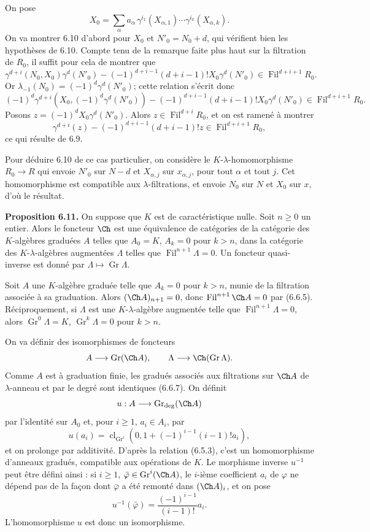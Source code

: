 \documentclass[11pt]{article}
\newcommand{\Gr}{\operatorname{Gr}}
\newcommand{\Fil}{\operatorname{Fil}}
\newcommand{\cl}{\operatorname{cl}}
\providecommand{\Gr}{\operatorname{Gr}}
\providecommand{\Gr}{\operatorname{G}}
\begin{document}
On pose
\[
  X_0=\sum_\alpha a_\alpha\,
       \gamma^{i_1}(X_{\alpha,1})\cdots
       \gamma^{i_k}(X_{\alpha,k}).
\]
On va montrer 6.10 d'abord pour \(X_0\) et \(N'_0=N_0+d\), qui vérifient bien les hypothèses de 6.10. Compte tenu de la remarque faite plus haut sur la filtration de \(R_0\), il suffit pour cela de montrer que
\[
  \gamma^{d+i}(N_0,X_0)\gamma^d(N'_0)
  -
  (-1)^{d+i-1}(d+i-1)!X_0\gamma^d(N'_0)
  \in\Fil^{d+i+1}R_0 .
\]
Or \(\lambda_{-1}(N_0)=(-1)^d\gamma^d(N'_0)\); cette relation s'écrit donc
\[
  (-1)^d\gamma^{d+i}(X_0,(-1)^d\gamma^d(N'_0))
  -
  (-1)^{d+i-1}(d+i-1)!X_0\gamma^d(N'_0)
  \in\Fil^{d+i+1}R_0 .
\]
Posons \(z=(-1)^dX_0\gamma^d(N'_0)\). Alors \(z\in\Fil^{d+i}R_0\), et on est ramené à montrer
\[
  \gamma^{d+i}(z)-(-1)^{d+i-1}(d+i-1)!z\in\Fil^{d+i+1}R_0,
\]
ce qui résulte de 6.9.

Pour déduire 6.10 de ce cas particulier, on considère le \(K\)-\(\lambda\)-homomorphisme \(R_0\to R\) qui envoie \(N'_0\) sur \(N-d\) et \(X_{\alpha,j}\) sur \(x_{\alpha,j}\), pour tout \(\alpha\) et tout \(j\). Cet homomorphisme est compatible aux \(\lambda\)-filtrations, et envoie \(N_0\) sur \(N\) et \(X_0\) sur \(x\), d'où le résultat.

\textbf{Proposition 6.11.} On suppose que \(K\) est de caractéristique nulle. Soit \(n\ge0\) un entier. Alors le foncteur \(\Ch\) est une équivalence de catégories de la catégorie des \(K\)-algèbres graduées \(A\) telles que \(A_0=K\), \(A_k=0\) pour \(k>n\), dans la catégorie des \(K\)-\(\lambda\)-algèbres augmentées \(\Lambda\) telles que \(\Fil^{n+1}\Lambda=0\). Un foncteur quasi-inverse est donné par \(\Lambda\mapsto\Gr\Lambda\).

Soit \(A\) une \(K\)-algèbre graduée telle que \(A_k=0\) pour \(k>n\), munie de la filtration associée à sa graduation. Alors \((\Ch A)_{n+1}=0\), donc \(\Fil^{n+1}\Ch A=0\) par (6.6.5). Réciproquement, si \(\Lambda\) est une \(K\)-\(\lambda\)-algèbre augmentée telle que \(\Fil^{n+1}\Lambda=0\), alors \(\Gr^0\Lambda=K\), \(\Gr^k\Lambda=0\) pour \(k>n\).

On va définir des isomorphismes de foncteurs
\[
  A\longrightarrow \Gr(\Ch A),
  \qquad
  \Lambda\longrightarrow \Ch(\Gr\Lambda).
\]
Comme \(A\) est à graduation finie, les gradués associés aux filtrations sur \(\Ch A\) de \(\lambda\)-anneau et par le degré sont identiques (6.6.7). On définit
\[
  u:A\longrightarrow \Gr_{\deg}(\Ch A)
\]
par l'identité sur \(A_0\) et, pour \(i\ge1\), \(a_i\in A_i\), par
\[
  u(a_i)=\cl_{\Gr^i}\left(0,1+(-1)^{i-1}(i-1)!a_i\right),
\]
et on prolonge par additivité. D'après la relation (6.5.3), c'est un homomorphisme d'anneaux gradués, compatible aux opérations de \(K\). Le morphisme inverse \(u^{-1}\) peut être défini ainsi : si \(i\ge1\), \(\bar\varphi\in\Gr^i(\Ch A)\), le \(i\)-ième coefficient \(a_i\) de \(\varphi\) ne dépend pas de la façon dont \(\bar\varphi\) a été remonté dans \((\Ch A)_i\), et on pose
\[
  u^{-1}(\bar\varphi)=\frac{(-1)^{i-1}}{(i-1)!}a_i.
\]
L'homomorphisme \(u\) est donc un isomorphisme.
\end{document}
